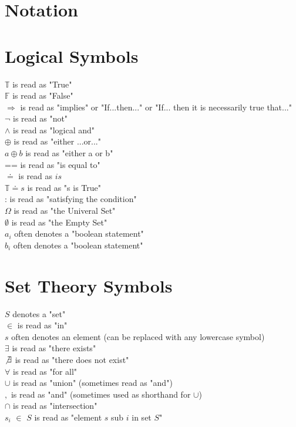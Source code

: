 \documentclass[11pt]{article}
\begin{document}
\section*{Notation}







\section*{Logical Symbols}
$\mathbb{T}$ is read as "True"\\
$\mathbb{F}$ is read as "False"\\
$\Rightarrow$ is read as "implies" or "If...then..." or "If... then it is necessarily true that..."\\
$\lnot$ is read as "not"\\
$\land$ is read as "logical and"\\
$\oplus$ is read as "either ...or..."\\
$a \oplus b$ is read as "either a or b"\\
== is read as "is equal to"\\
$\doteq$ is read as $is$\\
$\mathbb{T} \doteq s $ is read as "s is True"\\
: is read as "satisfying the condition"\\
$\Omega$ is read as "the Univeral Set"\\
$\emptyset$ is read as "the Empty Set"\\
$a_i$ often denotes a "boolean statement"\\
$b_i$ often denotes a "boolean statement"\\







\section*{Set Theory Symbols}
$S$ denotes a "set"\\
$\in$ is read as "in"\\
$s$ often denotes an element (can be replaced with any lowercase symbol)\\
$\exists$ is read as "there exists"\\
$\not \exists$ is read as "there does not exist"\\
$\forall$ is read as "for all"\\
$\cup$ is read as "union" (sometimes read as "and")\\
$,$ \hspace{.5mm} is read as "and" (sometimes used as shorthand for $\cup$)\\
$\cap$ is read as "intersection"\\
$s_i$ $\in$ $S$ is read as "element $s$ sub $i$ in set $S$"\\
\end{document}
